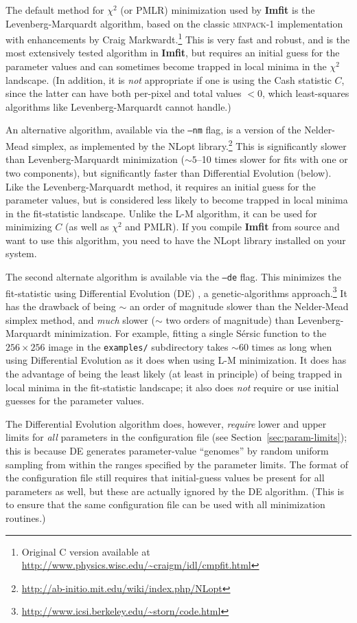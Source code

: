 \documentclass[10pt,a4paper,article]{memoir}
\newcommand{\imfit}{\textbf{Imfit}}
\newcommand{\chisquare}{\ensuremath{\chi^{2}}}
\newcommand{\pmlr}{PMLR}
\begin{document}
The default method for \chisquare{} (or \pmlr) minimization
used by \imfit{} is the Levenberg-Marquardt algorithm, based on the
classic \textsc{minpack-1} implementation \citep{more78} with
enhancements by Craig Markwardt.\footnote{Original C version available
at \url{http://www.physics.wisc.edu/~craigm/idl/cmpfit.html}} This is
very fast and robust, and is the most extensively tested algorithm in
\imfit, but requires an initial guess for the parameter values and can
sometimes become trapped in local minima in the \chisquare{} landscape.
(In addition, it is \textit{not} appropriate if one is using the Cash
statistic $C$, since the latter can have both per-pixel and total values
$< 0$, which least-squares algorithms like Levenberg-Marquardt cannot
handle.)

An alternative algorithm, available via the \texttt{--nm} flag,  is a
version of the Nelder-Mead simplex, as implemented by the NLopt
library.\footnote{\url{http://ab-initio.mit.edu/wiki/index.php/NLopt}}
This is significantly slower than Levenberg-Marquardt minimization
($\sim 5$--10 times slower for fits with one or two components), but
significantly faster than Differential Evolution (below). Like the
Levenberg-Marquardt method, it requires an initial guess for the
parameter values, but is considered less likely to become trapped in
local minima in the fit-statistic landscape. Unlike the L-M algorithm,
it can be used for minimizing $C$ (as well as \chisquare{} and
\pmlr). If you compile \imfit{} from source and want to use
this algorithm, you need to have the NLopt library installed on your
system.

The second alternate algorithm is available via the \texttt{--de} flag.
This minimizes the fit-statistic using Differential Evolution (DE)
\citep{de}, a genetic-algorithms
approach.\footnote{\url{http://www.icsi.berkeley.edu/~storn/code.html}}
It has the drawback of being $\sim$ an order of magnitude slower than
the Nelder-Mead simplex method, and \textit{much} slower ($\sim$ two
orders of magnitude) than Levenberg-Marquardt minimization. For example,
fitting a single S\'ersic function to the $256 \times 256$ image in the
\texttt{examples/} subdirectory takes $\sim 60$ times as long when using
Differential Evolution as it does when using L-M minimization. It does
has the advantage of being the least likely (at least in principle) of
being trapped in local minima in the fit-statistic landscape; it also
does \textit{not} require or use initial guesses for the parameter values.

The Differential Evolution algorithm does, however, \textit{require}
lower and upper limits for \textit{all} parameters in the configuration
file (see Section~\ref{sec:param-limits}); this is because DE generates
parameter-value ``genomes'' by random uniform sampling from within the
ranges specified by the parameter limits. The format of the
configuration file still requires that initial-guess values be present
for all parameters as well, but these are actually ignored by the DE
algorithm. (This is to ensure that the same configuration file can be
used with all minimization routines.)
\end{document}
